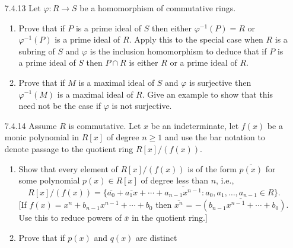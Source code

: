 \begin{enumerate}
   \item[7.4.13]  Let $\varphi : R \rightarrow S$ be a homomorphism of
                  commutative rings.
                  \begin{enumerate}
                     \item Prove that if $P$ is a prime ideal of $S$ then either
                           $\varphi^{-1}(P) = R$ or $\varphi^{-1}(P)$ is a prime
                           ideal of $R$. Apply this to the special case when $R$
                           is a subring of $S$ and $\varphi$ is the inclusion
                           homomorphism to deduce that if $P$ is a prime ideal
                           of $S$ then $P \cap R$ is either $R$ or a prime ideal
                           of $R$.
                     \item Prove that if $M$ is a maximal ideal of $S$ and
                           $\varphi$ is surjective then $\varphi^{-1}(M)$ is a
                           maximal ideal of $R$. Give an example to show that 
                           this need not be the case if $\varphi$ is not
                           surjective.
                  \end{enumerate}
   \item[7.4.14]  Assume $R$ is commutative. Let $x$ be an indeterminate, let
                  $f(x)$ be a monic polynomial in $R[x]$ of degree $n \ge 1$ and
                  use the bar notation to denote passage to the quotient ring
                  $R[x]/(f(x))$.
                  \begin{enumerate}
                     \item Show that every element of $R[x]/(f(x))$ is of the
                           form $\overline{p(x)}$ for some polynomial
                           $p(x) \in R[x]$ of degree less than $n$, i.e.,
                           $$R[x]/(f(x)) = \{\overline{a_0} + \overline{a_1x}
                             + \cdots + \overline{a_{n-1}x^{n-1}} : a_0, a_1, 
                             \ldots, a_{n-1} \in R\}.$$
                           [If $f(x) = x^n + b_{n-1}x^{n-1} + \cdots + b_0$ then
                           $\overline{x^n}$ =
                           $\overline{-(b_{n-1}x^{n-1} + \cdots + b_0)}$. Use
                           this to reduce powers of $\overline{x}$ in the
                           quotient ring.]
                     \item Prove that if $p(x)$ and $q(x)$ are distinct

\end{enumerate}
\end{enumerate}
